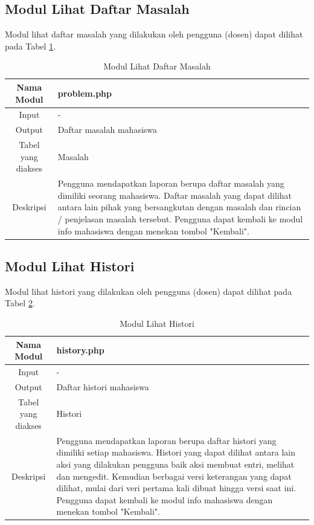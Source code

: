 \subsection{Modul Lihat Daftar Masalah}
Modul lihat daftar masalah yang dilakukan oleh pengguna (dosen) dapat dilihat pada Tabel \ref{tab:modullihatmasalah}.

\begin{table}[ht]
\centering
\caption[Tabel Modul Lihat Daftar Masalah]{Modul Lihat Daftar Masalah}
\label{tab:modullihatmasalah}
\begin{tabular}{|c|p{10cm}|}
\hline
Nama Modul & problem.php\\
\hline
Input & -\\
\hline
Output & Daftar masalah mahasiswa\\
\hline
Tabel yang diakses & Masalah\\
\hline
Deskripsi & Pengguna mendapatkan laporan berupa daftar masalah yang dimiliki seorang mahasiswa. Daftar masalah yang dapat dilihat antara lain pihak yang bersangkutan dengan masalah dan rincian / penjelasan masalah tersebut. Pengguna dapat kembali ke modul info mahasiswa dengan menekan tombol "Kembali".\\
\hline
\end{tabular}
\end{table}

\subsection{Modul Lihat Histori}
Modul lihat histori yang dilakukan oleh pengguna (dosen) dapat dilihat pada
Tabel \ref{tab:modullihathistori}.

\begin{table}[ht]
\centering
\caption[Tabel Modul Lihat Histori]{Modul Lihat Histori}
\label{tab:modullihathistori}
\begin{tabular}{|c|p{10cm}|}
\hline
Nama Modul & history.php\\
\hline
Input & -\\
\hline
Output & Daftar histori mahasiswa\\
\hline
Tabel yang diakses & Histori\\
\hline
Deskripsi & Pengguna mendapatkan laporan berupa daftar histori yang dimiliki setiap mahasiswa. Histori yang dapat dilihat antara lain aksi yang dilakukan pengguna baik aksi membuat entri, melihat dan mengedit. Kemudian berbagai versi keterangan yang dapat dilihat, mulai dari veri pertama kali dibuat hingga versi saat ini. Pengguna dapat kembali ke modul info mahasiswa dengan menekan tombol "Kembali".\\
\hline
\end{tabular}
\end{table}

